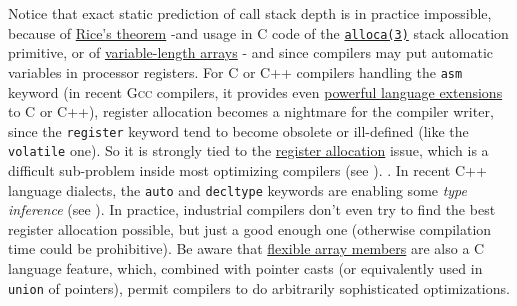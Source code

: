  Notice that exact static prediction of call stack depth is in
 practice impossible, because of
 \href{https://en.wikipedia.org/wiki/Rice's_theorem}{Rice's theorem}
  -and usage in C code of the
 \href{https://man7.org/linux/man-pages/man3/alloca.3.html}{\texttt{alloca(3)}}
 stack allocation primitive, or of
 \href{https://en.wikipedia.org/wiki/Variable-length_array}{variable-length
   arrays} - and since compilers may put automatic variables in
  processor registers. For C or C++
 compilers handling the \texttt{asm} keyword (in recent \textsc{Gcc}
 compilers, it provides even
 \href{https://gcc.gnu.org/onlinedocs/gcc/Using-Assembly-Language-with-C.html}{powerful
   language extensions} to C or C++), register allocation becomes a
 nightmare for the compiler writer, since the \texttt{register}
  keyword tend to become
 obsolete or ill-defined 
 (like the \texttt{volatile} one). So it is strongly tied to the
 \href{https://en.wikipedia.org/wiki/Register_allocation}{register
   allocation} issue, which is a difficult sub-problem inside most
 optimizing compilers (see \cite{eisl:2016:traceregalloc,
   Chaitin:1981:regalloc, Aho:2006:DragonBook}).   . In recent C++ language dialects, the \texttt{auto} and
   \texttt{decltype} keywords are enabling some \emph{type
 inference}  (see \cite{pierce:2002:types,
   Stroustrup:2014:CplusPlus, Stroustrup:2020:thriving,
   CplusPlus11:std}). In practice, industrial compilers don't even try
 to find the best register allocation possible, but just a good enough
 one (otherwise compilation time could be prohibitive). Be aware that
 \href{https://en.wikipedia.org/wiki/Flexible_array_member}{flexible
   array members} are also a C language feature, which, combined with
   pointer casts (or
 equivalently used in \texttt{union} of pointers), permit compilers to
 do arbitrarily sophisticated optimizations.
 
\bigskip




